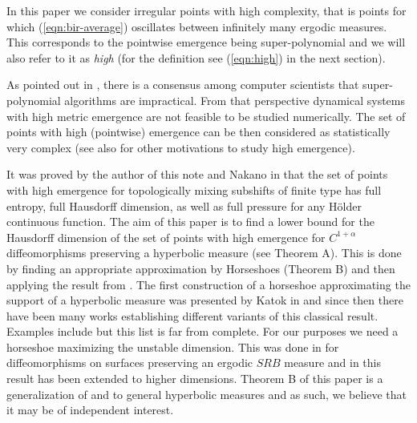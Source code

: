 \documentclass{amsart}
\theoremstyle{plain}
\theoremstyle{definition}
\theoremstyle{remark}
\numberwithin{equation}{section}
\begin{document}
In this paper we consider irregular points with high complexity, that is points for which (\ref{eqn:bir-average}) oscillates between infinitely many ergodic measures.
This corresponds to the pointwise emergence being super-polynomial and we will also refer to it as \textit{high} (for the definition see (\ref{eqn:high}) in the next section).  
 

As pointed out in \cite{Berger2017}, there is a consensus among computer scientists that super-polynomial algorithms are impractical. From that perspective dynamical systems with high metric emergence are not feasible to be studied numerically.
The set of points with high (pointwise) emergence can be then considered as statistically very complex (see also \cite{Berger2020,BBo} for other motivations to study high emergence).

It was proved by the author of this note and Nakano in \cite{NakZ} that the set of points with high emergence for topologically mixing subshifts of finite type has full entropy, full Hausdorff dimension, as well as full pressure for any H\"older continuous function.
The aim of this paper is to find a lower bound for the Hausdorff dimension of the set of points with high emergence for $C^{1+\alpha}$ diffeomorphisms preserving a hyperbolic measure (see Theorem A).
This is done by finding an appropriate approximation by Horseshoes (Theorem B) and then applying the result from \cite{NakZ}.   
The first construction of a horseshoe approximating the support of a hyperbolic measure was presented by Katok in \cite{Katok1980} and since then there have been many works establishing different variants of this classical result.
Examples include \cite{ACW, Chung, Gel, Luz, Mendoza, Mis, Per, Przyt, Sanchez, Yang} but this list is far from complete.
For our purposes we need a horseshoe maximizing the unstable dimension. 
This was done in \cite{Mendoza} for diffeomorphisms on surfaces preserving an ergodic $SRB$ measure and in \cite{Sanchez} this result has been extended to higher dimensions.
Theorem B of this paper is a generalization of  \cite{Mendoza} and  \cite{Sanchez} to general hyperbolic measures and as such, we believe that it may be of independent interest.




\end{document}
